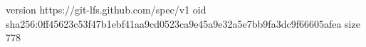 version https://git-lfs.github.com/spec/v1
oid sha256:0ff45623c53f47b1ebf41aa9cd0523ca9e45a9e32a5e7bb9fa3dc9f66605afea
size 778

